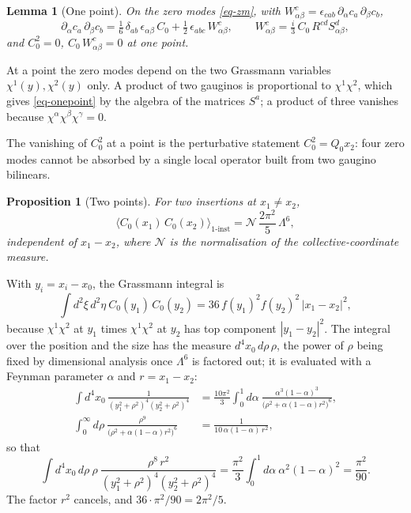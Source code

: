\documentclass[11pt]{article}
\numberwithin{equation}{section}
\numberwithin{figure}{section}
\numberwithin{table}{section}
\newtheorem{proposition}[theorem]{Proposition}
\newtheorem{lemma}[theorem]{Lemma}
\theoremstyle{definition}
\begin{document}
\begin{lemma}[One point]\label{lem-onepoint}
On the zero modes \eqref{eq-zm}, with $W^c_{\alpha\beta}=\epsilon_{cab}\,\partial_\alpha c_a\,\partial_\beta c_b$,
\begin{equation}\label{eq-onepoint}
\partial_\alpha c_a\,\partial_\beta c_b=\tfrac16\,\delta_{ab}\,\epsilon_{\alpha\beta}\,C_0+\tfrac12\,\epsilon_{abc}\,W^c_{\alpha\beta},\qquad
W^c_{\alpha\beta}=\tfrac{i}{3}\,C_0\,R^{cd}S^d_{\alpha\beta},
\end{equation}
and $C_0^2=0$, $C_0\,W^c_{\alpha\beta}=0$ at one point.
\end{lemma}

\begin{proofbox}
At a point the zero modes depend on the two Grassmann variables $\chi^1(y),\chi^2(y)$ only. A product of two gauginos is proportional to $\chi^1\chi^2$, which gives \eqref{eq-onepoint} by the algebra of the matrices $S^a$; a product of three vanishes because $\chi^\alpha\chi^\beta\chi^\gamma=0$.
\end{proofbox}

The vanishing of $C_0^2$ at a point is the perturbative statement $C_0^2=Q_0x_2$: four zero modes cannot be absorbed by a single local operator built from two gaugino bilinears.

\begin{proposition}[Two points]\label{prop-twopoint}
For two insertions at $x_1\neq x_2$,
\begin{equation}\label{eq-twopoint}
\big\langle C_0(x_1)\,C_0(x_2)\big\rangle_{1\text{-inst}}=\mathcal N\,\frac{2\pi^2}{5}\,\Lambda^6 ,
\end{equation}
independent of $x_1-x_2$, where $\mathcal N$ is the normalisation of the collective-coordinate measure.
\end{proposition}

\begin{proofbox}
With $y_i=x_i-x_0$, the Grassmann integral is
\[
\int d^2\xi\,d^2\eta\ C_0(y_1)\,C_0(y_2)=36\,f(y_1)^2f(y_2)^2\,|x_1-x_2|^2 ,
\]
because $\chi^1\chi^2$ at $y_1$ times $\chi^1\chi^2$ at $y_2$ has top component $|y_1-y_2|^2$. The integral over the position and the size has the measure $d^4x_0\,d\rho\,\rho$, the power of $\rho$ being fixed by dimensional analysis once $\Lambda^6$ is factored out; it is evaluated with a Feynman parameter $\alpha$ and $r=x_1-x_2$:
\begin{align*}
\int d^4x_0\,\frac{1}{(y_1^2+\rho^2)^4(y_2^2+\rho^2)^4}&=\frac{10\pi^2}{3}\int_0^1d\alpha\ \frac{\alpha^3(1-\alpha)^3}{\big(\rho^2+\alpha(1-\alpha)r^2\big)^6},\\
\int_0^\infty d\rho\ \frac{\rho^9}{\big(\rho^2+\alpha(1-\alpha)r^2\big)^6}&=\frac{1}{10\,\alpha(1-\alpha)\,r^2},
\end{align*}
so that
\[
\int d^4x_0\,d\rho\ \rho\ \frac{\rho^8\,r^2}{(y_1^2+\rho^2)^4(y_2^2+\rho^2)^4}=\frac{\pi^2}{3}\int_0^1d\alpha\ \alpha^2(1-\alpha)^2=\frac{\pi^2}{90} .
\]
The factor $r^2$ cancels, and $36\cdot\pi^2/90=2\pi^2/5$.
\end{proofbox}
\end{document}

